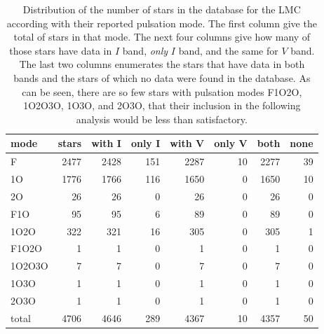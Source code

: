 \begin{table}
	\centering
	\begin{tabular}{l|rrrrrrr}
		mode &     stars &  with I & only I & with V & only V & both &  none \\ \hline\hline
		F      &  2477 &  2428 &       151 &  2287 &        10 &  2277 &    39 \\
		1O     &  1776 &  1766 &       116 &  1650 &         0 &  1650 &    10 \\
		2O     &    26 &    26 &         0 &    26 &         0 &    26 &     0 \\
		F1O    &    95 &    95 &         6 &    89 &         0 &    89 &     0 \\
		1O2O   &   322 &   321 &        16 &   305 &         0 &   305 &     1 \\
		F1O2O  &     1 &     1 &         0 &     1 &         0 &     1 &     0 \\
		1O2O3O &     7 &     7 &         0 &     7 &         0 &     7 &     0 \\
		1O3O   &     1 &     1 &         0 &     1 &         0 &     1 &     0 \\
		2O3O   &     1 &     1 &         0 &     1 &         0 &     1 &     0 \\\hline
		total  &  4706 &  4646 &       289 &  4367 &        10 &  4357 &    50 \\
		\end{tabular}
		\caption[Pulsation mode and filter data distribution for the LMC]{
			Distribution of the number of stars in the database for the LMC according with their reported pulsation mode.
			The first column give the total of stars in that mode.
			The next four columns give how many of those stars have data in $I$ band, \textit{only} $I$ band, and the same for $V$ band.
			The last two columns enumerates the stars that have data in both bands and the stars of which no data were found in the database.
			As can be seen, there are so few stars with pulsation modes F1O2O, 1O2O3O, 1O3O, and 2O3O, 
			that their inclusion in the following analysis would be less than satisfactory.
		}
		\label{tab:LMC}
\end{table}


